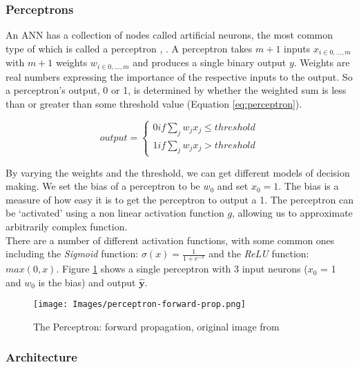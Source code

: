 \subsubsection{Perceptrons}

An ANN has a collection of nodes called artificial neurons, the most common type of which is called a perceptron \cite{methods-for-ds-slides}, \cite{neural-networks-book}. A perceptron takes $m + 1$ inputs $x_{i\in{0,...,m}}$ with $m + 1$ weights $w_{i\in{0,...,m}}$ and produces a single binary output $y$. Weights are real numbers expressing the importance of the respective inputs to the output. So a perceptron's output, 0 or 1, is determined by whether the weighted sum is less than or greater than some threshold value (Equation \ref{eq:perceptron}).

\begin{equation}
    output = 
    \begin{cases} 
        0 if \sum_jw_jx_j \leqslant threshold \\
        1 if \sum_jw_jx_j > threshold
    \end{cases}
    \label{eq:perceptron}
\end{equation}

By varying the weights and the threshold, we can get different models of decision making. We set the bias of a perceptron to be $w_0$ and set $x_0 = 1$. The bias is a measure of how easy it is to get the perceptron to output a 1. The perceptron can be `activated' using a non linear activation function $g$, allowing us to approximate arbitrarily complex function. \\

There are a number of different activation functions, with some common ones including the \textit{Sigmoid} function: $ \sigma(x) = \frac{1}{1 + e^{-x}} $ and the \textit{ReLU} function: $ max(0, x) $. Figure \ref{fig:perceptron} shows a single perceptron with 3 input neurons ($x_0$ = 1 and $w_0$ is the bias) and output $\mathbf{\hat y}$.

\begin{figure}[H]
\begin{center}
    \texttt{[image: Images/perceptron-forward-prop.png]}
    \caption{The Perceptron: forward propagation, original image from \cite{methods-for-ds-slides}}
    \label{fig:perceptron}
\end{center}
\end{figure}

\subsubsection{Architecture}

